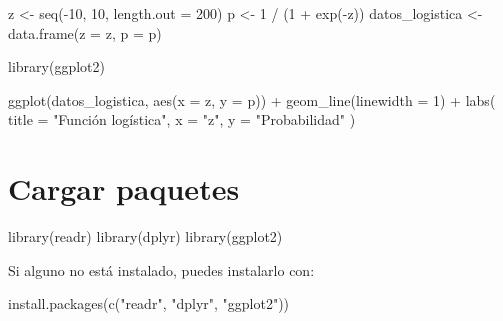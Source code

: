 \documentclass[
  11pt,
  letterpaper,
]{book}
\newenvironment{Shaded}{\begin{snugshade}}{\end{snugshade}}
\newcommand{\AttributeTok}[1]{\textcolor[rgb]{0.40,0.45,0.13}{#1}}
\newcommand{\DecValTok}[1]{\textcolor[rgb]{0.68,0.00,0.00}{#1}}
\newcommand{\FunctionTok}[1]{\textcolor[rgb]{0.28,0.35,0.67}{#1}}
\newcommand{\NormalTok}[1]{\textcolor[rgb]{0.00,0.23,0.31}{#1}}
\newcommand{\OtherTok}[1]{\textcolor[rgb]{0.00,0.23,0.31}{#1}}
\newcommand{\SpecialCharTok}[1]{\textcolor[rgb]{0.37,0.37,0.37}{#1}}
\newcommand{\StringTok}[1]{\textcolor[rgb]{0.13,0.47,0.30}{#1}}
\begin{document}
\begin{Shaded}
\begin{Highlighting}[]
\NormalTok{z }\OtherTok{\textless{}{-}} \FunctionTok{seq}\NormalTok{(}\SpecialCharTok{{-}}\DecValTok{10}\NormalTok{, }\DecValTok{10}\NormalTok{, }\AttributeTok{length.out =} \DecValTok{200}\NormalTok{)}
\NormalTok{p }\OtherTok{\textless{}{-}} \DecValTok{1} \SpecialCharTok{/}\NormalTok{ (}\DecValTok{1} \SpecialCharTok{+} \FunctionTok{exp}\NormalTok{(}\SpecialCharTok{{-}}\NormalTok{z))}
\NormalTok{datos\_logistica }\OtherTok{\textless{}{-}} \FunctionTok{data.frame}\NormalTok{(}\AttributeTok{z =}\NormalTok{ z, }\AttributeTok{p =}\NormalTok{ p)}

\FunctionTok{library}\NormalTok{(ggplot2)}

\FunctionTok{ggplot}\NormalTok{(datos\_logistica, }\FunctionTok{aes}\NormalTok{(}\AttributeTok{x =}\NormalTok{ z, }\AttributeTok{y =}\NormalTok{ p)) }\SpecialCharTok{+}
  \FunctionTok{geom\_line}\NormalTok{(}\AttributeTok{linewidth =} \DecValTok{1}\NormalTok{) }\SpecialCharTok{+}
  \FunctionTok{labs}\NormalTok{(}
    \AttributeTok{title =} \StringTok{"Función logística"}\NormalTok{,}
    \AttributeTok{x =} \StringTok{"z"}\NormalTok{,}
    \AttributeTok{y =} \StringTok{"Probabilidad"}
\NormalTok{  )}
\end{Highlighting}
\end{Shaded}

\section{Cargar paquetes}\label{cargar-paquetes-2}

\begin{Shaded}
\begin{Highlighting}[]
\FunctionTok{library}\NormalTok{(readr)}
\FunctionTok{library}\NormalTok{(dplyr)}
\FunctionTok{library}\NormalTok{(ggplot2)}
\end{Highlighting}
\end{Shaded}

Si alguno no está instalado, puedes instalarlo con:

\begin{Shaded}
\begin{Highlighting}[]
\FunctionTok{install.packages}\NormalTok{(}\FunctionTok{c}\NormalTok{(}\StringTok{"readr"}\NormalTok{, }\StringTok{"dplyr"}\NormalTok{, }\StringTok{"ggplot2"}\NormalTok{))}
\end{Highlighting}
\end{Shaded}
\end{document}
